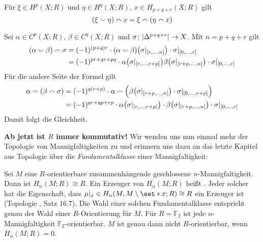 \begin{lemma}[{name=[{Zusammenhang von Cup- und Cap-Produkt}]},label=lem:cup_n_cap]
	Für $\xi \in H^p(X;R)$ und $\eta \in H^q(X;R)$, $x \in H_{p+q+r}(X;R)$ gilt 
	\[
		\enbrace*{\xi \cupp \eta} \capp x = \xi \capp \enbrace*{\eta \capp x}
	\]
\end{lemma}
\begin{beweis}
	Sei $\alpha \in C^p(X;R)$, $\beta \in C^q(X;R)$ und $\sigma \colon \abs{\Delta^{p+q+r}}\to X$. Mit $n=p+q+r$ gilt
	\begin{align}
		\enbrace*{\alpha \cupp \beta} \capp \sigma &= (-1)^{(p+q)r} \cdot (\alpha \cupp \beta)\enbrace*{\sigma|_{\benbrace*{r,\ldots ,n}}} \cdot \sigma|_{\benbrace*{0,\ldots ,r}} \\
		&= (-1)^{pr+qr+pq} \cdot \alpha \enbrace*{\sigma|_{\benbrace*{r,\ldots ,r+p}}} \beta \enbrace*{\sigma|_{\benbrace*{r+p,\ldots ,n}}} \cdot \sigma|_{\benbrace*{0,\ldots ,r}}
	\end{align}
	Für die andere Seite der Formel gilt
	\begin{align}
		\alpha \capp (\beta \capp \sigma) &= (-1)^{q(r+p)} \cdot \alpha \capp \enbrace[\Big]{\beta \enbrace*{\sigma|_{\benbrace*{r+p,\ldots ,n}}} \cdot \sigma|_{\benbrace{0,\ldots ,r+p}}} \\
		&= (-1)^{qr+qp+rp} \cdot \alpha \enbrace*{\sigma|_{\benbrace*{r,\ldots,r+p}}} \cdot \beta \enbrace*{\sigma|_{\benbrace*{r+p,\ldots ,n}}} \cdot \sigma|_{\benbrace*{0,\ldots ,r}}
	\end{align}
	Damit folgt die Gleichheit.
\end{beweis}

\textbf{Ab jetzt ist $R$ immer kommutativ!} 
Wir wenden uns nun einmal mehr der Topologie von Mannigfaltigkeiten zu und erinnern uns dazu an das letzte Kapitel aus Topologie  über die \emph{Fundamentalklasse} einer Mannigfaltigkeit:

\begin{erinnerungA}[{name=[Fundamentalklasse]}]
	Sei $M$ eine $R$-orientierbare zusammenhängende geschlossene $n$-Mannigfaltigkeit. 
	Dann ist $H_n(M;R) \cong R$.
	Ein Erzeuger von $H_n(M;R)$ heißt .
	Jeder solcher hat die Eigenschaft, dass $\mu|_x \in H_n(M,M \setminus \set*{x};R) \cong R$ ein Erzeuger ist (Topologie , Satz 16.7). 
	Die Wahl einer solchen Fundamentalklasse entspricht genau der Wahl einer $R$-Orientierung für $M$.
	Für $R=\mathbb{F}_2$ ist jede $n$-Mannigfaltigkeit $\mathbb{F}_2$-orientierbar. 
	$M$ ist genau dann nicht $R$-orientierbar, wenn $H_n(M;R)=0$.
\end{erinnerungA}

